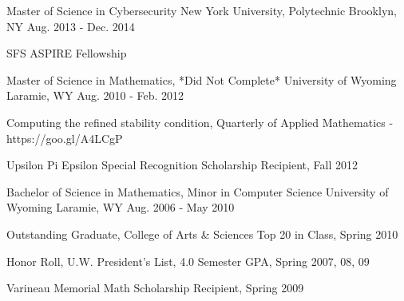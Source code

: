 


\begin{cventries}

\cventry
{Master of Science in Cybersecurity} %
{New York University, Polytechnic} %
{Brooklyn, NY} %
{Aug. 2013 - Dec. 2014} %
{
\begin{cvitems}
\item {SFS ASPIRE Fellowship}
\end{cvitems}
}

\cventry
{Master of Science in Mathematics, *Did Not Complete*} %
{University of Wyoming} %
{Laramie, WY} %
{Aug. 2010 - Feb. 2012} %
{
\begin{cvitems}
\item{Computing the refined stability condition, Quarterly of Applied Mathematics - https://goo.gl/A4LCgP}
\item {Upsilon Pi Epsilon Special Recognition Scholarship Recipient, Fall 2012}
\end{cvitems}
}

\cventry
{Bachelor of Science in Mathematics, Minor in Computer Science} %
{University of Wyoming} %
{Laramie, WY} %
{Aug. 2006 - May 2010} %
{
\begin{cvitems}
\item {Outstanding Graduate, College of Arts \& Sciences Top 20 in Class, Spring 2010}
\item {Honor Roll, U.W. President’s List, 4.0 Semester GPA, Spring 2007, 08, 09}
\item {Varineau Memorial Math Scholarship Recipient, Spring 2009}
\end{cvitems}
}


\end{cventries}